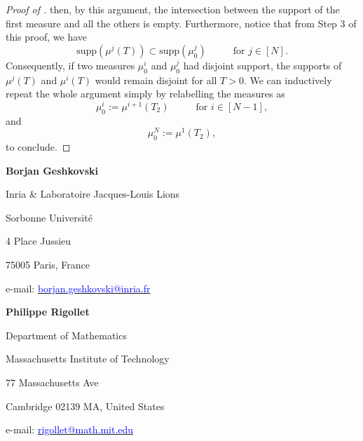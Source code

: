 \documentclass[a4paper,11pt]{article}
\theoremstyle{plain}
\newcommand{\supp}{\mathrm{supp}}
\numberwithin{equation}{section}
\begin{document}
\begin{proof}[Proof of ]
then, by this argument, the intersection between the support of the first measure and all the others is empty. Furthermore, notice that from Step 3 of this proof, we have
\begin{equation*}
    \supp\left(\mu^j(T)\right)\subset\supp\left(\mu_0^j\right) \hspace{1cm} \text{ for } j\in[N].
\end{equation*}
Consequently, if two measures $\mu^i_0$ and $\mu^j_0$ had disjoint support, the supports of $\mu^j(T)$ and $\mu^i(T)$ would remain disjoint for all $T>0$. We can inductively repeat the whole argument simply by relabelling the measures as
\begin{equation*}
    \mu_0^i:=\mu^{i+1}(T_2)\hspace{1cm }\text{ for } i\in[N-1],
\end{equation*}
and
\begin{equation*}
    \mu_0^N:=\mu^{1}(T_2),
\end{equation*}
to conclude.
\end{proof}




	
	\newpage

\begin{minipage}[t]{.5\textwidth}
{\footnotesize{\bf Borjan Geshkovski}\par
  Inria \&
  Laboratoire Jacques-Louis Lions\par
  Sorbonne Université\par
  4 Place Jussieu\par
  75005 Paris, France\par
 \par
  e-mail: \href{mailto:borjan.geshkovski@inria.fr}{\textcolor{blue}{\scriptsize borjan.geshkovski@inria.fr}}
  }
\end{minipage}%
\begin{minipage}[t]{.5\textwidth}
  {\footnotesize{\bf Philippe Rigollet}\par
  Department of Mathematics\par
  Massachusetts Institute of Technology\par
  77 Massachusetts Ave\par
  Cambridge 02139 MA, United States\par
 \par
  e-mail: \href{mailto:blank}{\textcolor{blue}{\scriptsize rigollet@math.mit.edu}}
  }
\end{minipage}%
\end{document}
